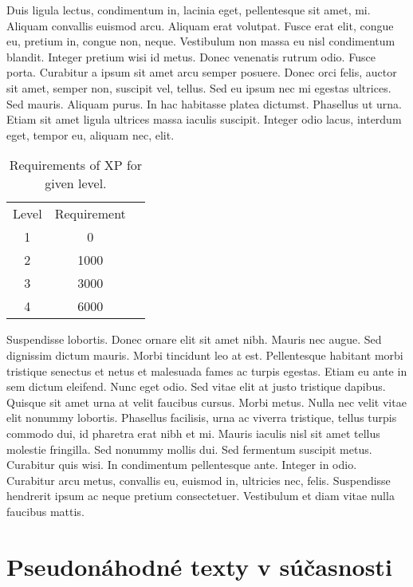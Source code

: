 \documentclass[thesismargins, thesislinespacing, twoside, upjsfrontpage]{rnthesis}
\begin{document}

Duis ligula lectus, condimentum in, lacinia eget, pellentesque sit
amet, mi. Aliquam convallis euismod arcu. Aliquam erat volutpat.
Fusce erat elit, congue eu, pretium in, congue non, neque.
Vestibulum non massa eu nisl condimentum blandit. Integer pretium
wisi id metus. Donec venenatis rutrum odio. Fusce porta. Curabitur
a ipsum sit amet arcu semper posuere. Donec orci felis, auctor sit
amet, semper non, suscipit vel, tellus. Sed eu ipsum nec mi egestas
ultrices. Sed mauris. Aliquam purus. In hac habitasse platea
dictumst. Phasellus ut urna. Etiam sit amet ligula ultrices massa
iaculis suscipit. Integer odio lacus, interdum eget, tempor eu,
aliquam nec, elit.

\begin{table}
\begin{center}
\begin{tabular}{ccc}
Level & Requirement\\
1 & 0\\
2 & 1000\\
3 & 3000\\
4 & 6000
\end{tabular}
\end{center}
\caption{Requirements of XP for given level.}
\end{table}
Suspendisse lobortis. Donec ornare elit sit amet nibh. Mauris nec
augue. Sed dignissim dictum mauris. Morbi tincidunt leo at est.
Pellentesque habitant morbi tristique senectus et netus et
malesuada fames ac turpis egestas. Etiam eu ante in sem dictum
eleifend. Nunc eget odio. Sed vitae elit at justo tristique
dapibus. Quisque sit amet urna at velit faucibus cursus.
Morbi metus. Nulla nec velit vitae elit
nonummy lobortis. Phasellus facilisis, urna ac viverra tristique,
tellus turpis commodo dui, id pharetra erat nibh et mi. Mauris
iaculis nisl sit amet tellus molestie fringilla. Sed nonummy mollis
dui. Sed fermentum suscipit metus. Curabitur quis wisi. In
condimentum pellentesque ante. Integer in odio. Curabitur arcu
metus, convallis eu, euismod in, ultricies nec, felis. Suspendisse
hendrerit ipsum ac neque pretium consectetuer. Vestibulum et diam
vitae nulla faucibus mattis. 


\chapter{Pseudonáhodné texty v súčasnosti}
\end{document}

